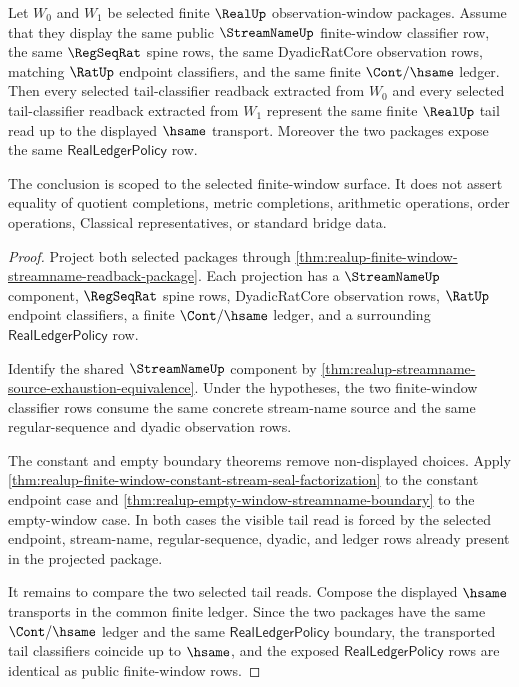 \begin{theorem}
\label{thm:realup-streamname-regseqrat-tail-selector-determinacy}
Let $W_0$ and $W_1$ be selected finite $\RealUp$ observation-window packages.
Assume that they display the same public $\StreamNameUp$ finite-window
classifier row, the same $\RegSeqRat$ spine rows, the same DyadicRatCore
observation rows, matching $\RatUp$ endpoint classifiers, and the same finite
$\Cont/\hsame$ ledger. Then every selected tail-classifier readback extracted
from $W_0$ and every selected tail-classifier readback extracted from $W_1$
represent the same finite $\RealUp$ tail read up to the displayed $\hsame$
transport. Moreover the two packages expose the same
$\mathsf{RealLedgerPolicy}$ row.

The conclusion is scoped to the selected finite-window surface. It does not
assert equality of quotient completions, metric completions, arithmetic
operations, order operations, Classical representatives, or standard bridge
data.
\end{theorem}
\begin{proof}
Project both selected packages through
\autoref{thm:realup-finite-window-streamname-readback-package}. Each projection
has a $\StreamNameUp$ component, $\RegSeqRat$ spine rows, DyadicRatCore
observation rows, $\RatUp$ endpoint classifiers, a finite $\Cont/\hsame$ ledger,
and a surrounding $\mathsf{RealLedgerPolicy}$ row.

Identify the shared $\StreamNameUp$ component by
\autoref{thm:realup-streamname-source-exhaustion-equivalence}. Under the
hypotheses, the two finite-window classifier rows consume the same concrete
stream-name source and the same regular-sequence and dyadic observation rows.

The constant and empty boundary theorems remove non-displayed choices. Apply
\autoref{thm:realup-finite-window-constant-stream-seal-factorization} to the
constant endpoint case and
\autoref{thm:realup-empty-window-streamname-boundary} to the empty-window case.
In both cases the visible tail read is forced by the selected endpoint,
stream-name, regular-sequence, dyadic, and ledger rows already present in the
projected package.

It remains to compare the two selected tail reads. Compose the displayed
$\hsame$ transports in the common finite ledger. Since the two packages have the
same $\Cont/\hsame$ ledger and the same $\mathsf{RealLedgerPolicy}$ boundary,
the transported tail classifiers coincide up to $\hsame$, and the exposed
$\mathsf{RealLedgerPolicy}$ rows are identical as public finite-window rows.
\end{proof}

